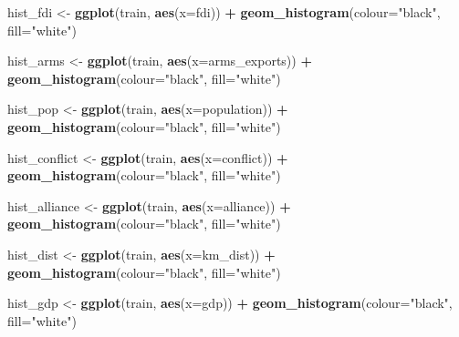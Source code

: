 \documentclass[11pt,]{article}
\newenvironment{Shaded}{\begin{snugshade}}{\end{snugshade}}
\newcommand{\DataTypeTok}[1]{\textcolor[rgb]{0.13,0.29,0.53}{#1}}
\newcommand{\KeywordTok}[1]{\textcolor[rgb]{0.13,0.29,0.53}{\textbf{#1}}}
\newcommand{\NormalTok}[1]{#1}
\newcommand{\OperatorTok}[1]{\textcolor[rgb]{0.81,0.36,0.00}{\textbf{#1}}}
\newcommand{\StringTok}[1]{\textcolor[rgb]{0.31,0.60,0.02}{#1}}
\begin{document}
\begin{Shaded}
\begin{Highlighting}[]
\NormalTok{hist_fdi <-}\StringTok{ }\KeywordTok{ggplot}\NormalTok{(train, }\KeywordTok{aes}\NormalTok{(}\DataTypeTok{x=}\NormalTok{fdi)) }\OperatorTok{+}\StringTok{ }
\StringTok{    }\KeywordTok{geom_histogram}\NormalTok{(}\DataTypeTok{colour=}\StringTok{"black"}\NormalTok{, }\DataTypeTok{fill=}\StringTok{"white"}\NormalTok{)}

\NormalTok{hist_arms <-}\StringTok{ }\KeywordTok{ggplot}\NormalTok{(train, }\KeywordTok{aes}\NormalTok{(}\DataTypeTok{x=}\NormalTok{arms_exports)) }\OperatorTok{+}\StringTok{ }
\StringTok{    }\KeywordTok{geom_histogram}\NormalTok{(}\DataTypeTok{colour=}\StringTok{"black"}\NormalTok{, }\DataTypeTok{fill=}\StringTok{"white"}\NormalTok{)}

\NormalTok{hist_pop <-}\StringTok{ }\KeywordTok{ggplot}\NormalTok{(train, }\KeywordTok{aes}\NormalTok{(}\DataTypeTok{x=}\NormalTok{population)) }\OperatorTok{+}\StringTok{ }
\StringTok{    }\KeywordTok{geom_histogram}\NormalTok{(}\DataTypeTok{colour=}\StringTok{"black"}\NormalTok{, }\DataTypeTok{fill=}\StringTok{"white"}\NormalTok{)}

\NormalTok{hist_conflict <-}\StringTok{ }\KeywordTok{ggplot}\NormalTok{(train, }\KeywordTok{aes}\NormalTok{(}\DataTypeTok{x=}\NormalTok{conflict)) }\OperatorTok{+}\StringTok{ }
\StringTok{    }\KeywordTok{geom_histogram}\NormalTok{(}\DataTypeTok{colour=}\StringTok{"black"}\NormalTok{, }\DataTypeTok{fill=}\StringTok{"white"}\NormalTok{)}

\NormalTok{hist_alliance <-}\StringTok{ }\KeywordTok{ggplot}\NormalTok{(train, }\KeywordTok{aes}\NormalTok{(}\DataTypeTok{x=}\NormalTok{alliance)) }\OperatorTok{+}\StringTok{ }
\StringTok{    }\KeywordTok{geom_histogram}\NormalTok{(}\DataTypeTok{colour=}\StringTok{"black"}\NormalTok{, }\DataTypeTok{fill=}\StringTok{"white"}\NormalTok{)}

\NormalTok{hist_dist <-}\StringTok{ }\KeywordTok{ggplot}\NormalTok{(train, }\KeywordTok{aes}\NormalTok{(}\DataTypeTok{x=}\NormalTok{km_dist)) }\OperatorTok{+}\StringTok{ }
\StringTok{    }\KeywordTok{geom_histogram}\NormalTok{(}\DataTypeTok{colour=}\StringTok{"black"}\NormalTok{, }\DataTypeTok{fill=}\StringTok{"white"}\NormalTok{)}

\NormalTok{hist_gdp <-}\StringTok{ }\KeywordTok{ggplot}\NormalTok{(train, }\KeywordTok{aes}\NormalTok{(}\DataTypeTok{x=}\NormalTok{gdp)) }\OperatorTok{+}\StringTok{ }
\StringTok{    }\KeywordTok{geom_histogram}\NormalTok{(}\DataTypeTok{colour=}\StringTok{"black"}\NormalTok{, }\DataTypeTok{fill=}\StringTok{"white"}\NormalTok{)}


\end{Highlighting}
\end{Shaded}
\end{document}
